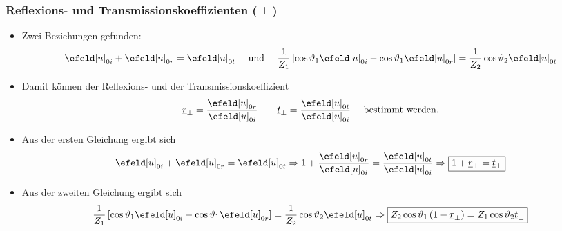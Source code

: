 \begin{frame}
  \frametitle{Reflexions- und Transmissionskoeffizienten (\(\perp\))}  
\begin{itemize}[<+->]
\item Zwei Beziehungen gefunden:
  \begin{equation*}
    \efeld[u]_{0i} + \efeld[u]_{0r}= \efeld[u]_{0t} \quad\text{ und }\quad \frac{1}{Z_1}\left[   \cos\vartheta_1\efeld[u]_{0i}  -\cos\vartheta_1 \efeld[u]_{0r} \right] = \frac{1}{Z_2} \cos\vartheta_2 \efeld[u]_{0t}
  \end{equation*}
\item Damit können der \alert{Reflexions-} und der \alert{Transmissionskoeffizient}
  \begin{equation*}
    \underline{r}_\perp = \frac{\efeld[u]_{0r}}{\efeld[u]_{0i}} \qquad \underline{t}_\perp = \frac{\efeld[u]_{0t}}{\efeld[u]_{0i}} \quad\text{ bestimmt werden.} 
  \end{equation*}
\item Aus der ersten Gleichung ergibt sich
  \begin{equation*}
    \efeld[u]_{0i} + \efeld[u]_{0r}= \efeld[u]_{0t} \Rightarrow  1+ \frac{\efeld[u]_{0r}}{\efeld[u]_{0i}}= \frac{\efeld[u]_{0t}}{\efeld[u]_{0i}} \Rightarrow \boxed{1+\underline{r}_\perp = \underline{t}_\perp}
\end{equation*}
\item Aus der zweiten Gleichung ergibt sich
  \begin{equation*}
    \frac{1}{Z_1}\left[   \cos\vartheta_1\efeld[u]_{0i}  -\cos\vartheta_1 \efeld[u]_{0r} \right] = \frac{1}{Z_2} \cos\vartheta_2 \efeld[u]_{0t} \Rightarrow  \boxed{Z_2\cos\vartheta_1\left(1-\underline{r}_\perp\right) = Z_1 \cos\vartheta_2\underline{t}_\perp}
\end{equation*}
  \end{itemize}
\end{frame}

